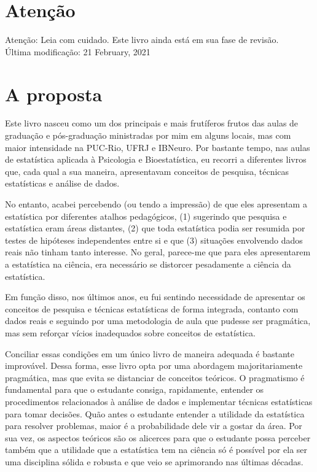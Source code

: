 \documentclass[
]{book}
\begin{document}
\hypertarget{atenuxe7uxe3o}{%
\section{Atenção}\label{atenuxe7uxe3o}}

Atenção: Leia com cuidado. Este livro ainda está em sua fase de
revisão.\\
Última modificação: 21 February, 2021

\hypertarget{a-proposta}{%
\section{A proposta}\label{a-proposta}}

Este livro nasceu como um dos principais e mais frutíferos frutos das
aulas de graduação e pós-graduação ministradas por mim em alguns locais,
mas com maior intensidade na PUC-Rio, UFRJ e IBNeuro. Por bastante
tempo, nas aulas de estatística aplicada à Psicologia e Bioestatística,
eu recorri a diferentes livros que, cada qual a sua maneira,
apresentavam conceitos de pesquisa, técnicas estatísticas e análise de
dados.

No entanto, acabei percebendo (ou tendo a impressão) de que eles
apresentam a estatística por diferentes atalhos pedagógicos, (1)
sugerindo que pesquisa e estatística eram áreas distantes, (2) que toda
estatística podia ser resumida por testes de hipóteses independentes
entre si e que (3) situações envolvendo dados reais não tinham tanto
interesse. No geral, parece-me que para eles apresentarem a estatística
na ciência, era necessário se distorcer pesadamente a ciência da
estatística.

Em função disso, nos últimos anos, eu fui sentindo necessidade de
apresentar os conceitos de pesquisa e técnicas estatísticas de forma
integrada, contanto com dados reais e seguindo por uma metodologia de
aula que pudesse ser pragmática, mas sem reforçar vícios inadequados
sobre conceitos de estatística.

Conciliar essas condições em um único livro de maneira adequada é
bastante improvável. Dessa forma, esse livro opta por uma abordagem
majoritariamente pragmática, mas que evita se distanciar de conceitos
teóricos. O pragmatismo é fundamental para que o estudante consiga,
rapidamente, entender os procedimentos relacionados à análise de dados e
implementar técnicas estatísticas para tomar decisões. Quão antes o
estudante entender a utilidade da estatística para resolver problemas,
maior é a probabilidade dele vir a gostar da área. Por sua vez, os
aspectos teóricos são os alicerces para que o estudante possa perceber
também que a utilidade que a estatística tem na ciência só é possível
por ela ser uma disciplina sólida e robusta e que veio se aprimorando
nas últimas décadas.
\end{document}
